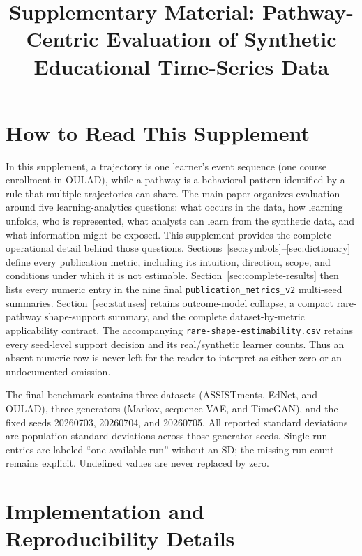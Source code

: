 \documentclass[10pt]{article}
\title{Supplementary Material: Pathway-Centric Evaluation of Synthetic Educational Time-Series Data}
\author{}
\date{}
\begin{document}
\maketitle
\appendix
\fi

\section{How to Read This Supplement}

In this supplement, a trajectory is one learner's event sequence (one course
enrollment in OULAD), while a pathway is a behavioral pattern identified by a
rule that multiple trajectories can share. The main paper organizes evaluation
around five learning-analytics questions:
what occurs in the data, how learning unfolds, who is represented, what
analysts can learn from the synthetic data, and what information might be
exposed.  This supplement provides the complete operational detail behind those
questions.  Sections~\ref{sec:symbols}--\ref{sec:dictionary} define every
publication metric, including its intuition, direction, scope, and conditions
under which it is not estimable.  Section~\ref{sec:complete-results} then lists
every numeric entry in the nine final \texttt{publication\_metrics\_v2}
multi-seed summaries.  Section~\ref{sec:statuses} retains outcome-model
collapse, a compact rare-pathway shape-support summary, and the complete
dataset-by-metric applicability contract.  The accompanying
\texttt{rare-shape-estimability.csv} retains every seed-level support decision
and its real/synthetic learner counts. Thus an absent numeric row is never left
for the reader to interpret as either zero or an undocumented omission.

The final benchmark contains three datasets (ASSISTments, EdNet, and OULAD),
three generators (Markov, sequence VAE, and TimeGAN), and the fixed seeds
20260703, 20260704, and 20260705.  All reported standard deviations are
population standard deviations across those generator seeds. Single-run entries
are labeled ``one available run'' without an SD; the missing-run count remains
explicit. Undefined values are never replaced by zero.

\section{Implementation and Reproducibility Details}
\label{sec:implementation}
\end{document}

